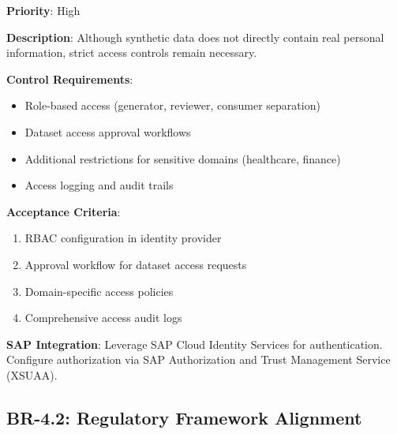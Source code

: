 \documentclass[12pt,a4paper,twoside]{report}
\begin{document}
\begin{tcolorbox}[colback=red!5,colframe=red!70,title=BR-4.1: Role-Based Access Control]
\textbf{Priority}: High

\textbf{Description}: Although synthetic data does not directly contain real
personal information, strict access controls remain necessary.

\textbf{Control Requirements}:
\begin{itemize}
\item Role-based access (generator, reviewer, consumer separation)
\item Dataset access approval workflows
\item Additional restrictions for sensitive domains (healthcare, finance)
\item Access logging and audit trails
\end{itemize}

\textbf{Acceptance Criteria}:
\begin{enumerate}
\item RBAC configuration in identity provider
\item Approval workflow for dataset access requests
\item Domain-specific access policies
\item Comprehensive access audit logs
\end{enumerate}

\textbf{SAP Integration}: Leverage SAP Cloud Identity Services for authentication.
Configure authorization via SAP Authorization and Trust Management Service (XSUAA).
\end{tcolorbox}

\subsection{BR-4.2: Regulatory Framework Alignment}
\end{document}
